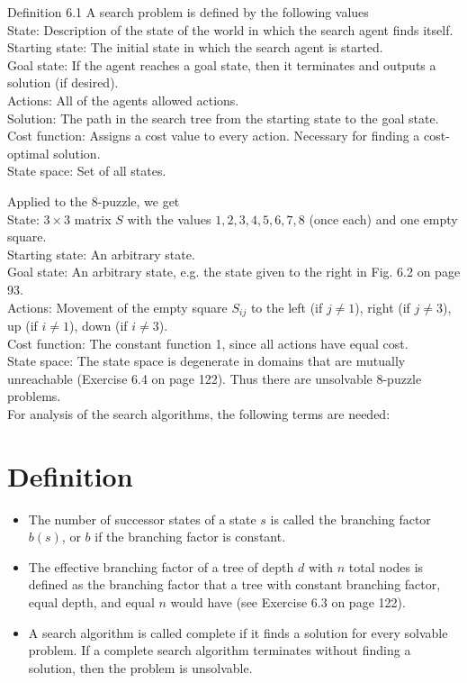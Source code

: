 \documentclass[10pt]{book}
\begin{document}
Definition 6.1 A search problem is defined by the following values\\
State: Description of the state of the world in which the search agent finds itself.\\
Starting state: The initial state in which the search agent is started.\\
Goal state: If the agent reaches a goal state, then it terminates and outputs a solution (if desired).\\
Actions: All of the agents allowed actions.\\
Solution: The path in the search tree from the starting state to the goal state.\\
Cost function: Assigns a cost value to every action. Necessary for finding a cost-optimal solution.\\
State space: Set of all states.

Applied to the 8-puzzle, we get\\
State: $3 \times 3$ matrix $S$ with the values $1,2,3,4,5,6,7,8$ (once each) and one empty square.\\
Starting state: An arbitrary state.\\
Goal state: An arbitrary state, e.g. the state given to the right in Fig. 6.2 on page 93.\\
Actions: Movement of the empty square $S_{i j}$ to the left (if $j \neq 1$), right (if $j \neq 3$), up (if $i \neq 1$), down (if $i \neq 3$).\\
Cost function: The constant function 1, since all actions have equal cost.\\
State space: The state space is degenerate in domains that are mutually unreachable (Exercise 6.4 on page 122). Thus there are unsolvable 8-puzzle problems.\\
For analysis of the search algorithms, the following terms are needed:

\section{Definition}
\begin{itemize}
  \item The number of successor states of a state $s$ is called the branching factor $b(s)$, or $b$ if the branching factor is constant.
  \item The effective branching factor of a tree of depth $d$ with $n$ total nodes is defined as the branching factor that a tree with constant branching factor, equal depth, and equal $n$ would have (see Exercise 6.3 on page 122).
  \item A search algorithm is called complete if it finds a solution for every solvable problem. If a complete search algorithm terminates without finding a solution, then the problem is unsolvable.
\end{itemize}
\end{document}
